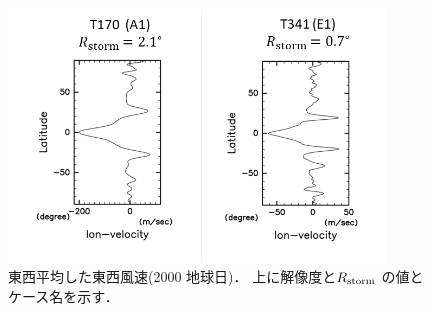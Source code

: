 \documentclass[a4j,12pt,openbib,oneside]{jreport}
\begin{document}
%
%
\begin{figure}[ht]
  \begin{center}
    \includegraphics[clip,width=10cm]{./fig/result/case4/case4_vellon.png}
    \caption{
      \footnotesize{東西平均した東西風速(2000 地球日)．
上に解像度と$R_{\rm{storm}}$ の値とケース名を示す．
      }
    }
    \label{fig:case4_vellon}
  \end{center}
\end{figure}
%

%
%
\def\chap4{議論とまとめ}
\end{document}
